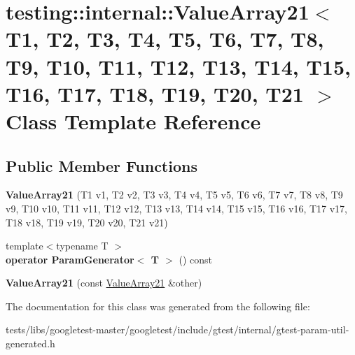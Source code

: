 \hypertarget{classtesting_1_1internal_1_1ValueArray21}{}\section{testing\+:\+:internal\+:\+:Value\+Array21$<$ T1, T2, T3, T4, T5, T6, T7, T8, T9, T10, T11, T12, T13, T14, T15, T16, T17, T18, T19, T20, T21 $>$ Class Template Reference}
\label{classtesting_1_1internal_1_1ValueArray21}
\subsection*{Public Member Functions}
\begin{DoxyCompactItemize}
\item 
\mbox{\label{classtesting_1_1internal_1_1ValueArray21_a111043ab8258ecb243c67c84d1f8e0f4}} 
{\bfseries Value\+Array21} (T1 v1, T2 v2, T3 v3, T4 v4, T5 v5, T6 v6, T7 v7, T8 v8, T9 v9, T10 v10, T11 v11, T12 v12, T13 v13, T14 v14, T15 v15, T16 v16, T17 v17, T18 v18, T19 v19, T20 v20, T21 v21)
\item 
\mbox{\label{classtesting_1_1internal_1_1ValueArray21_aa5b2264c55d6b5315622e2e5c3deeb35}} 
{\footnotesize template$<$typename T $>$ }\\{\bfseries operator Param\+Generator$<$ T $>$} () const
\item 
\mbox{\label{classtesting_1_1internal_1_1ValueArray21_af0804d08ff252ed8f942ac48f90ccef3}} 
{\bfseries Value\+Array21} (const \hyperlink{classtesting_1_1internal_1_1ValueArray21}{Value\+Array21} \&other)
\end{DoxyCompactItemize}


The documentation for this class was generated from the following file\+:\begin{DoxyCompactItemize}
\item 
tests/libs/googletest-\/master/googletest/include/gtest/internal/gtest-\/param-\/util-\/generated.\+h\end{DoxyCompactItemize}
